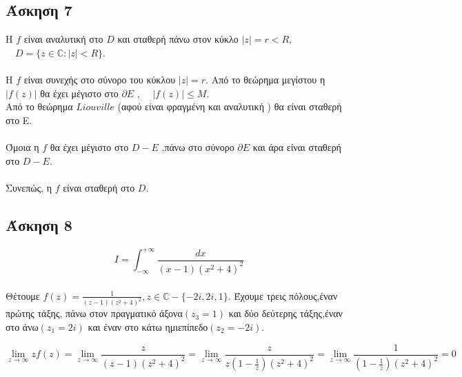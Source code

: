 \documentclass[12pt]{article}
\begin{document}
 \subsection{Άσκηση 7}
Η $f$ είναι αναλυτική στο $D$ και σταθερή πάνω στον κύκλο 
$|z|=r< R ,$\\$ \quad D= \{ z \in \mathbb{C} : |z| < R \}$.
\\ \\
Η $f$ είναι συνεχής στο σύνορο του κύκλου $|z|=r$. Από το θεώρημα μεγίστου η $|f(z)|$ θα έχει μέγιστο στο $\partial{E}$ , $\quad |f(z)|\leq M$.
\\
Από το θεώρημα $Liouville$ (αφού είναι φραγμένη και αναλυτική ) θα είναι σταθερή στο Ε.
\\ \\
Όμοια η $f$ θα έχει μέγιστο στο $D-E$ ,πάνω στο σύνορο $\partial{E}$ και άρα είναι σταθερή στο $D-Ε$.
\\ \\
Συνεπώς, η $f$ είναι σταθερή στο $D$.

\newpage
 \subsection{Άσκηση 8}
$$I= \int_{-\infty}^{+\infty} \frac{dx}{(x-1)(x^2+4)^2}$$
\\
Θέτουμε $ f(z)=\frac{1}{(z-1)(z^2+4)^2},z\in\mathbb{C}-\{-2i,2i,1\} $. Έχουμε τρεις πόλους,έναν πρώτης τάξης,
πάνω στον πραγματικό άξονα$(z_3=1) $ και δύο δεύτερης τάξης,έναν στο άνω$(z_1=2i)$ και  έναν στο κάτω ημιεπίπεδο$(z_2=-2i)$.

$$ \lim_{z \to \infty } zf(z)=\lim_{z \to \infty } \frac{z}{(z-1)(z^2+4)^2}=
\lim_{z \to \infty } \frac{z}{z\left(1-\frac{1}{z}\right)(z^2+4)^2}=
\lim_{z \to \infty } \frac{1}{\left(1-\frac{1}{z}\right)(z^2+4)^2}=0$$
\end{document}

